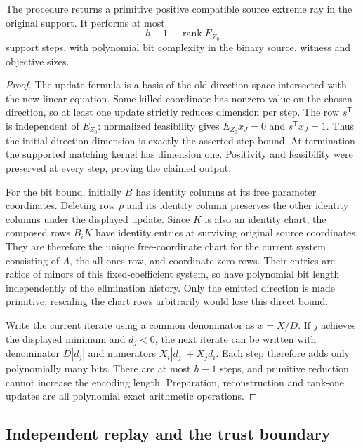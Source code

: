 \begin{proposition}
The procedure returns a primitive positive compatible source extreme ray in
the original support.  It performs at most
\[
 h-1-\operatorname{rank}E_{Z_0}
\]
support steps, with polynomial bit complexity in the binary source, witness
and objective sizes.
\end{proposition}
\begin{proof}
The update formula is a basis of the old direction space intersected with
the new linear equation.  Some killed coordinate has nonzero value on the
chosen direction, so at least one update strictly reduces dimension per step.
The row $s^{\mathsf T}$ is independent of $E_{Z_0}$: normalized feasibility
gives $E_{Z_0}x_J=0$ and $s^{\mathsf T}x_J=1$.  Thus the initial direction
dimension is exactly the asserted step bound.  At termination the supported
matching kernel has dimension one.  Positivity and feasibility were preserved
at every step, proving the claimed output.

For the bit bound, initially $B$ has identity columns at its free parameter
coordinates.  Deleting row $p$ and its identity column preserves the other
identity columns under the displayed update.  Since $K$ is also an identity
chart, the composed rows $B_iK$ have identity entries at surviving original
source coordinates.  They are therefore the unique free-coordinate chart
for the current system consisting of $A$, the all-ones row, and coordinate
zero rows.  Their entries are ratios of minors of this fixed-coefficient
system, so have polynomial bit length independently of the elimination
history.  Only the emitted direction is made primitive; rescaling the chart
rows arbitrarily would lose this direct bound.

Write the current iterate using a common denominator as $x=X/D$.  If $j$
achieves the displayed minimum and $d_j<0$, the next iterate can be written
with denominator $D|d_j|$ and numerators
$X_i|d_j|+X_jd_i$.  Each step therefore adds only polynomially many bits.
There are at most $h-1$ steps, and primitive reduction cannot increase the
encoding length.  Preparation, reconstruction and rank-one updates are all
polynomial exact arithmetic operations.
\end{proof}

\subsection{Independent replay and the trust boundary}

